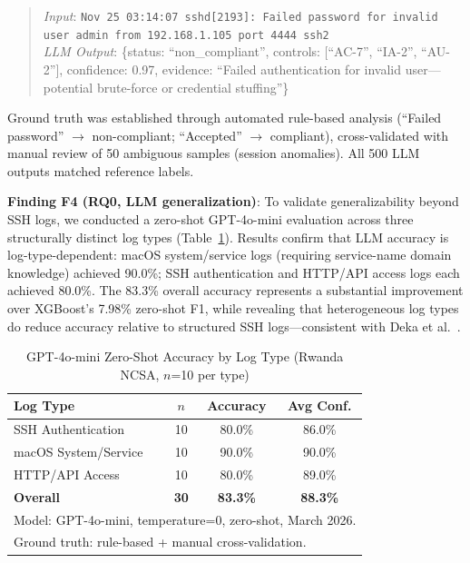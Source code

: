 \documentclass[11pt,conference]{IEEEtran}
\begin{document}
\begin{quote}
\textit{Input}: \texttt{Nov 25 03:14:07 sshd[2193]: Failed password for invalid user admin from 192.168.1.105 port 4444 ssh2}\\
\textit{LLM Output}: \{status: ``non\_compliant'', controls: [``AC-7'', ``IA-2'', ``AU-2''], confidence: 0.97, evidence: ``Failed authentication for invalid user---potential brute-force or credential stuffing''\}
\end{quote}

Ground truth was established through automated rule-based analysis (``Failed password'' $\rightarrow$ non-compliant; ``Accepted'' $\rightarrow$ compliant), cross-validated with manual review of 50 ambiguous samples (session anomalies). All 500 LLM outputs matched reference labels.

\textbf{Finding F4 (RQ0, LLM generalization)}: To validate generalizability beyond SSH logs, we conducted a zero-shot GPT-4o-mini evaluation across three structurally distinct log types (Table~\ref{tab:llm_multilog}). Results confirm that LLM accuracy is log-type-dependent: macOS system/service logs (requiring service-name domain knowledge) achieved 90.0\%; SSH authentication and HTTP/API access logs each achieved 80.0\%. The 83.3\% overall accuracy represents a substantial improvement over XGBoost's 7.98\% zero-shot F1, while revealing that heterogeneous log types do reduce accuracy relative to structured SSH logs---consistent with Deka et al.~\cite{deka2024}.

\begin{table}[!t]
\centering
\caption{GPT-4o-mini Zero-Shot Accuracy by Log Type (Rwanda NCSA, $n$=10 per type)}
\label{tab:llm_multilog}
\begin{tabular}{@{}lccc@{}}
\toprule
\textbf{Log Type} & \textbf{$n$} & \textbf{Accuracy} & \textbf{Avg Conf.} \\
\midrule
SSH Authentication & 10 & 80.0\% & 86.0\% \\
macOS System/Service & 10 & 90.0\% & 90.0\% \\
HTTP/API Access & 10 & 80.0\% & 89.0\% \\
\midrule
\textbf{Overall} & \textbf{30} & \textbf{83.3\%} & \textbf{88.3\%} \\
\bottomrule
\multicolumn{4}{l}{\footnotesize Model: GPT-4o-mini, temperature=0, zero-shot, March 2026.} \\
\multicolumn{4}{l}{\footnotesize Ground truth: rule-based + manual cross-validation.} \\
\end{tabular}
\end{table}
\end{document}
